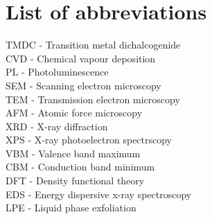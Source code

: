 \section*{List of abbreviations}

TMDC - Transition metal dichalcogenide\\
CVD - Chemical vapour deposition\\
PL - Photoluminescence\\
SEM - Scanning electron microscopy\\
TEM - Transmission electron microscopy\\
AFM - Atomic force microscopy\\
XRD - X-ray diffraction\\
XPS - X-ray photoelectron spectrscopy\\
VBM - Valence band maximum\\
CBM - Conduction band minimum\\
DFT - Density functional theory\\
EDS - Energy dispersive x-ray spectroscopy\\
LPE - Liquid phase exfoliation